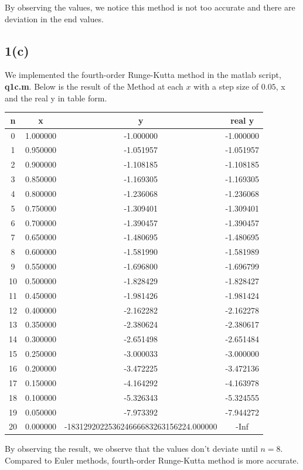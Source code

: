 \documentclass{article}
\begin{document}
By observing the values, we notice this method is not too accurate and there are deviation in the end values.
\begin{equation*}
\end{equation*}
\subsection*{1(c)}
We implemented the fourth-order Runge-Kutta method in the matlab script, \textbf{q1c.m}. Below is the result of the Method at each $x$ with a step size of $0.05$, x and the real y in table form.
\begin{center}
\begin{tabular}{|c|c|c|c|}
\hline
n & x & y & real y \\ \hline
0 & 1.000000 & -1.000000 & -1.000000 \\ \hline 
1 & 0.950000 & -1.051957 & -1.051957 \\ \hline 
2 & 0.900000 & -1.108185 & -1.108185 \\ \hline 
3 & 0.850000 & -1.169305 & -1.169305 \\ \hline 
4 & 0.800000 & -1.236068 & -1.236068 \\ \hline 
5 & 0.750000 & -1.309401 & -1.309401 \\ \hline 
6 & 0.700000 & -1.390457 & -1.390457 \\ \hline 
7 & 0.650000 & -1.480695 & -1.480695 \\ \hline 
8 & 0.600000 & -1.581990 & -1.581989 \\ \hline 
9 & 0.550000 & -1.696800 & -1.696799 \\ \hline 
10 & 0.500000 & -1.828429 & -1.828427 \\ \hline 
11 & 0.450000 & -1.981426 & -1.981424 \\ \hline 
12 & 0.400000 & -2.162282 & -2.162278 \\ \hline 
13 & 0.350000 & -2.380624 & -2.380617 \\ \hline 
14 & 0.300000 & -2.651498 & -2.651484 \\ \hline 
15 & 0.250000 & -3.000033 & -3.000000 \\ \hline 
16 & 0.200000 & -3.472225 & -3.472136 \\ \hline 
17 & 0.150000 & -4.164292 & -4.163978 \\ \hline 
18 & 0.100000 & -5.326343 & -5.324555 \\ \hline 
19 & 0.050000 & -7.973392 & -7.944272 \\ \hline 
20 & 0.000000 & -183129202253624666683263156224.000000 & -Inf \\ \hline 
\end{tabular}
\end{center}
By observing the result, we observe that the values don't deviate until $n=8$. Compared to Euler methods, fourth-order Runge-Kutta method is more accurate.
\end{document}
